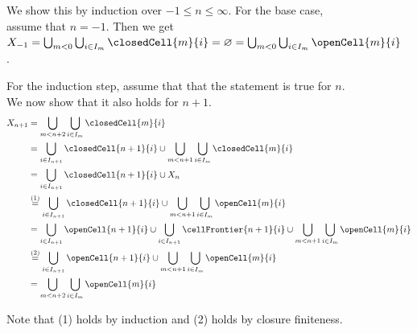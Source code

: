 \begin{figure}
    \centering
    \begin{framed}
    \begin{minipage}[t]{0.4\linewidth}
            \tiny
We show this by induction over $-1 \le n \le \infty$.
    For the base case, assume that $n = -1$.
    Then we get $X_{-1} = \bigcup_{m < 0}\bigcup_{i \in I_m}\closedCell{m}{i} = \varnothing = \bigcup_{m < 0}\bigcup_{i \in I_m} \openCell{m}{i}$.

    For the induction step, assume that that the statement is true for $n$.
    We now show that it also holds for $n + 1$.
    \begin{equation*}
        \begin{split}
            X_{n + 1} &= \bigcup_{m < n + 2}\bigcup_{i \in I_m} \closedCell{m}{i} \\
            &=\bigcup_{i \in I_{n + 1}}\closedCell{n+1}{i} \cup \bigcup_{m < n + 1}\bigcup_{i \in I_m} \closedCell{m}{i} \\
            &= \bigcup_{i \in I_{n + 1}}\closedCell{n+1}{i} \cup X_n \\
            &\stackrel{(1)}{=} \bigcup_{i \in I_{n + 1}}\closedCell{n+1}{i} \cup \bigcup_{m < n + 1}\bigcup_{i \in I_m} \openCell{m}{i} \\
            &= \bigcup_{i \in I_{n + 1}}\openCell{n+1}{i} \cup \bigcup_{i \in I_{n + 1}}\cellFrontier{n+1}{i} \cup \bigcup_{m < n + 1}\bigcup_{i \in I_m} \openCell{m}{i} \\
            &\stackrel{(2)}{=} \bigcup_{i \in I_{n + 1}}\openCell{n+1}{i} \cup \bigcup_{m < n + 1}\bigcup_{i \in I_m} \openCell{m}{i} \\
            &= \bigcup_{m < n + 2}\bigcup_{i \in I_m} \openCell{m}{i}
        \end{split}
    \end{equation*}
        \end{minipage}
        \hspace{0.5cm}
        \begin{minipage}[t]{0.4\linewidth}
            \tiny
Note that (1) holds by induction and (2) holds by closure finiteness.


\end{minipage}
\end{framed}
\end{figure}

